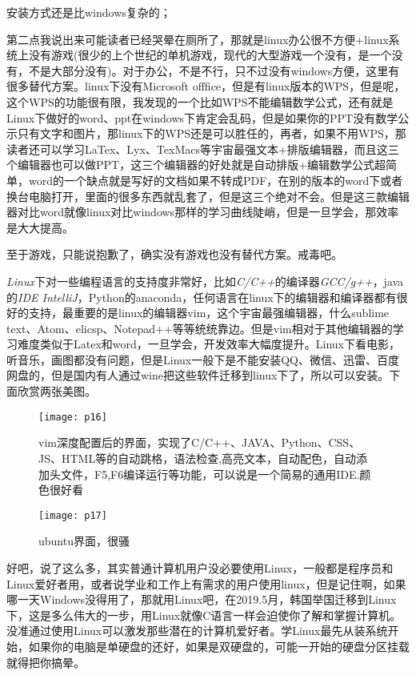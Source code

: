 \documentclass[utf8]{book}
\begin{document}
	安装方式还是比windows复杂的；
	
	第二点我说出来可能读者已经哭晕在厕所了，那就是linux办公很不方便+linux系统上没有游戏(很少的上个世纪的单机游戏，现代的大型游戏一个没有，是一个没有，不是大部分没有)。对于办公，不是不行，只不过没有windows方便，这里有很多替代方案。linux下没有Microsoft offfice，但是有linux版本的WPS，但是呢，这个WPS的功能很有限，我发现的一个比如WPS不能编辑数学公式，还有就是Linux下做好的word、ppt在windows下肯定会乱码，但是如果你的PPT没有数学公示只有文字和图片，那linux下的WPS还是可以胜任的，再者，如果不用WPS，那读者还可以学习LaTex、Lyx、TexMacs等宇宙最强文本+排版编辑器，而且这三个编辑器也可以做PPT，这三个编辑器的好处就是自动排版+编辑数学公式超简单，word的一个缺点就是写好的文档如果不转成PDF，在别的版本的word下或者换台电脑打开，里面的很多东西就乱套了，但是这三个绝对不会。但是这三款编辑器对比word就像linux对比windows那样的学习曲线陡峭，但是一旦学会，那效率是大大提高。
	
	至于游戏，只能说抱歉了，确实没有游戏也没有替代方案。戒毒吧。
	
	\textit{Linux}下对一些编程语言的支持度非常好，比如\textit{C/C++}的编译器\textit{GCC/g++}，java的\textit{IDE IntelliJ}，Python的anaconda，任何语言在linux下的编辑器和编译器都有很好的支持，最重要的是linux的编辑器vim，这个宇宙最强编辑器，什么sublime text、Atom、elicsp、Notepad++等等统统靠边。但是vim相对于其他编辑器的学习难度类似于Latex和word，一旦学会，开发效率大幅度提升。Linux下看电影，听音乐，画图都没有问题，但是Linux一般下是不能安装QQ、微信、迅雷、百度网盘的，但是国内有人通过wine把这些软件迁移到linux下了，所以可以安装。下面欣赏两张美图。
	
	\begin{figure}[H]
	\centering
	\texttt{[image: p16]}
	\caption{vim深度配置后的界面，实现了C/C++、JAVA、Python、CSS、JS、HTML等的自动跳格，语法检查,高亮文本，自动配色，自动添加头文件，F5,F6编译运行等功能，可以说是一个简易的通用IDE.颜色很好看}
	\end{figure}

	\begin{figure}[H]
	\centering
	\texttt{[image: p17]}
	\caption{ubuntu界面，很骚}
	\end{figure}
	
	好吧，说了这么多，其实普通计算机用户没必要使用Linux，一般都是程序员和Linux爱好者用，或者说学业和工作上有需求的用户使用linux，但是记住啊，如果哪一天Windows没得用了，那就用Linux吧，在2019.5月，韩国举国迁移到Linux下，这是多么伟大的一步，用Linux就像C语言一样会迫使你了解和掌握计算机。没准通过使用Linux可以激发那些潜在的计算机爱好者。学Linux最先从装系统开始，如果你的电脑是单硬盘的还好，如果是双硬盘的，可能一开始的硬盘分区挂载就得把你搞晕。
	
\end{document}
